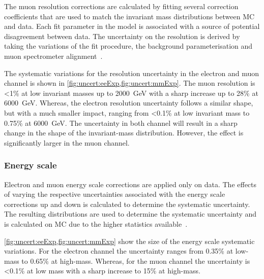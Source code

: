 The muon resolution corrections are calculated by fitting several correction coefficients that are used to match the invariant mass distributions between MC and data. Each fit parameter in the model is associated with a source of potential disagreement between data. The uncertainty on the resolution is derived by taking the variations of the fit procedure, the background parameterisation and muon spectrometer alignment~\cite{Aad:2016jkr}. 

The systematic variations for the resolution uncertainty in the electron and muon channel is shown in \cref{fig:uncert:eeExp,fig:uncert:mmExp}. The muon resolution is <1\% at low invariant masses up to \SI{2000}{\giga\electronvolt} with a sharp increase up to 28\% at \SI{6000}{\giga\electronvolt}. Whereas, the electron resolution uncertainty follows a similar shape, but with a much smaller impact, ranging from <0.1\% at low invariant mass to 0.75\% at \SI{6000}{\giga\electronvolt}. The uncertainty in both channel will result in a sharp change in the shape of the invariant-mass distribution. However, the effect is significantly larger in the muon channel. 


\subsubsection{Energy scale}
Electron and muon energy scale corrections are applied only on data. The effects of varying the respective uncertainties associated with the energy scale corrections up and down is calculated to determine the systematic uncertainty. The resulting distributions are used to determine the systematic uncertainty and is calculated on MC due to the higher statistics available~\cite{Aad:2019tso}. 

\cref{fig:uncert:eeExp,fig:uncert:mmExp} show the size of the energy scale systematic variations. For the electron channel the uncertainty ranges from 0.35\% at low-mass to 0.65\% at high-mass. Whereas, for the muon channel the uncertainty is <0.1\% at low mass with a sharp increase to 15\% at high-mass. 

